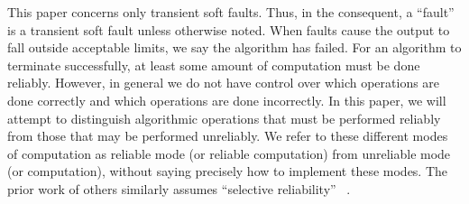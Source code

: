 
%
This paper concerns only transient soft faults. Thus, in the consequent, a ``fault'' is a transient 
soft fault unless otherwise noted. When faults cause the output to fall outside acceptable limits, 
we say the algorithm has failed.
For an algorithm to terminate successfully, at least some amount of computation must be done 
reliably. However, in general we do not have control over which operations are done correctly and 
which operations are done incorrectly. In this paper, we will attempt to distinguish algorithmic 
operations that must be performed reliably from those that may be performed unreliably. We refer to 
these different modes of computation as reliable mode (or reliable computation) from unreliable mode 
(or computation), without saying precisely how to implement these modes. The prior work of others 
similarly assumes ``selective reliability'' ~\cite{hoemmen2011reliability}.
